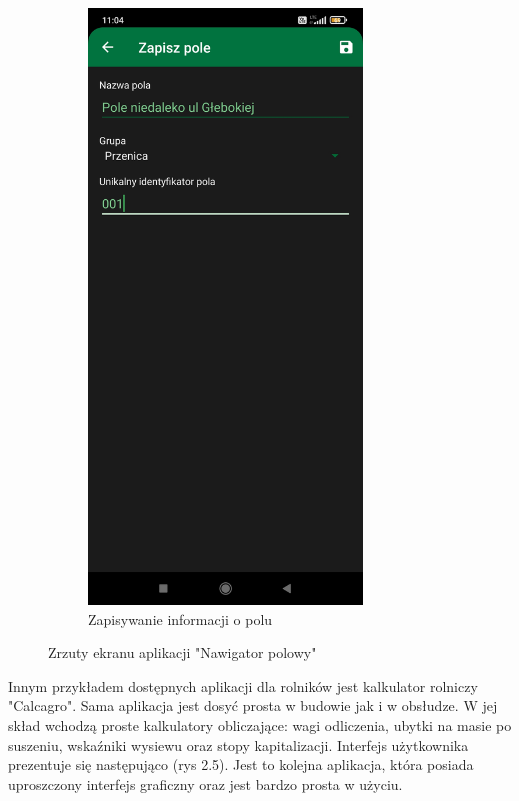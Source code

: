 \documentclass[a4paper,12pt,oneside]{book}
\begin{document}
\begin{figure}[H]
\begin{subfigure}{.5\textwidth}
			\includegraphics[width=0.8\textwidth]{grafika/nawigator_0.jpg}
			\caption{Zapisywanie informacji o polu}
		\end{subfigure}
		\caption{Zrzuty ekranu aplikacji "Nawigator polowy"}
	\end{figure}
	
	Innym przykładem dostępnych aplikacji dla rolników jest kalkulator rolniczy "Calcagro". Sama aplikacja jest dosyć prosta w budowie jak i w obsłudze. W jej skład wchodzą proste kalkulatory obliczające: wagi odliczenia, ubytki na masie po suszeniu, wskaźniki wysiewu oraz stopy kapitalizacji. Interfejs użytkownika prezentuje się następująco (rys 2.5). Jest to kolejna aplikacja, która posiada uproszczony interfejs graficzny oraz jest bardzo prosta w użyciu.
	
\end{document}
